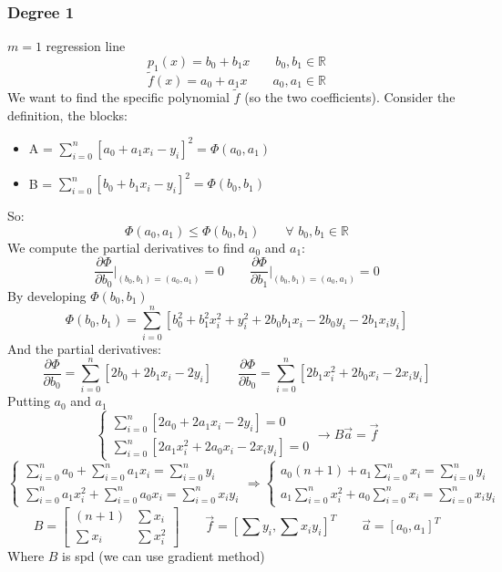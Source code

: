     \subsubsection{Degree 1}
    $m=1$ regression line
    $$
    p_1(x)=b_0+b_1x\qquad b_0,b_1\in\mathbb{R}
    $$
    $$
    \tilde{f}(x)=a_0+a_1x\qquad a_0,a_1\in\mathbb{R}
    $$
    We want to find the specific polynomial $\tilde{f}$ (so the two coefficients). Consider the definition, the blocks:
    \begin{itemize}
        \item A = $\sum_{i=0}^n\left[a_0+a_1x_i-y_i\right]^2=\Phi(a_0,a_1)$
        \item B = $\sum_{i=0}^n\left[b_0+b_1x_i-y_i\right]^2=\Phi(b_0,b_1)$
    \end{itemize}
    So:
    $$
    \Phi(a_0,a_1)\leq\Phi(b_0,b_1)\qquad\forall\,\,b_0,b_1\in\mathbb{R}
    $$
    We compute the partial derivatives to find $a_0$ and $a_1$:
    $$
    \frac{
        \partial\Phi
    }{\partial b_0}\Big|_{(b_0,b_1)=(a_0,a_1)}=0
    \qquad
    \frac{
        \partial\Phi
    }{\partial b_1}\Big|_{(b_0,b_1)=(a_0,a_1)}=0
    $$
    By developing $\Phi(b_0,b_1)$
    $$
    \Phi(b_0,b_1)=
    \sum_{i=0}^n\left[b_0^2+b_1^2x_i^2+y_i^2+2b_0b_1x_i-2b_0y_i-2b_1x_iy_i\right]
    $$
    And the partial derivatives:
    $$
    \frac{
        \partial\Phi
    }{\partial b_0}=\sum_{i=0}^n\left[
        2b_0+2b_1x_i-2y_i
    \right]
    \qquad
    \frac{
        \partial\Phi
    }{\partial b_0}=\sum_{i=0}^n\left[
        2b_1x_i^2+2b_0x_i-2x_iy_i
    \right]
    $$
    Putting $a_0$ and $a_1$
    $$
    \begin{cases}            
        \sum_{i=0}^n\left[
            2a_0+2a_1x_i-2y_i
        \right]=0
        \\
        \sum_{i=0}^n\left[
            2a_1x_i^2+2a_0x_i-2x_iy_i
        \right]=0
    \end{cases}\rightarrow B\overrightarrow{a}=\overrightarrow{f}
    $$
    $$
    \begin{cases}            
        \sum_{i=0}^na_0+\sum_{i=0}^na_1x_i=\sum_{i=0}^ny_i
        \\
        \sum_{i=0}^na_1x_i^2+\sum_{i=0}^na_0x_i=\sum_{i=0}^nx_iy_i
    \end{cases}
    \Rightarrow
    \begin{cases}            
        a_0(n+1)+a_1\sum_{i=0}^nx_i=\sum_{i=0}^ny_i
        \\
        a_1\sum_{i=0}^nx_i^2+a_0\sum_{i=0}^nx_i=\sum_{i=0}^nx_iy_i
    \end{cases}
    $$
    $$
    B=\begin{bmatrix}
        (n+1) & \sum x_i\\
        \sum x_i & \sum x_i^2
    \end{bmatrix}\qquad
    \overrightarrow{f}=\left[
        \sum y_i,\sum x_iy_i
    \right]^T\qquad
    \overrightarrow{a}=\left[
        a_0,a_1
    \right]^T
    $$
    Where $B$ is spd (we can use gradient method)

